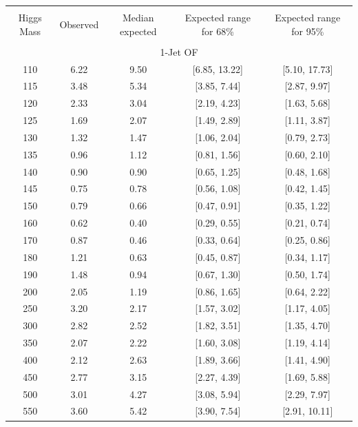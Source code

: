 \begin{table}[hbp!]
\begin{center}
\begin{tabular}{c c c c c}
\hline
\vspace{-3mm} && \\
 Higgs Mass & Observed  & Median expected & Expected range for 68\% & Expected range for 95\%   \\
\vspace{-3mm} && \\
\hline
\multicolumn{5}{c}{1-Jet OF} \\
\hline
110 & 6.22 & 9.50 & [6.85, 13.22] & [5.10, 17.73] \\
115 & 3.48 & 5.34 & [3.85, 7.44] & [2.87, 9.97] \\
120 & 2.33 & 3.04 & [2.19, 4.23] & [1.63, 5.68] \\
125 & 1.69 & 2.07 & [1.49, 2.89] & [1.11, 3.87] \\
130 & 1.32 & 1.47 & [1.06, 2.04] & [0.79, 2.73] \\
135 & 0.96 & 1.12 & [0.81, 1.56] & [0.60, 2.10] \\
140 & 0.90 & 0.90 & [0.65, 1.25] & [0.48, 1.68] \\
145 & 0.75 & 0.78 & [0.56, 1.08] & [0.42, 1.45] \\
150 & 0.79 & 0.66 & [0.47, 0.91] & [0.35, 1.22] \\
160 & 0.62 & 0.40 & [0.29, 0.55] & [0.21, 0.74] \\
170 & 0.87 & 0.46 & [0.33, 0.64] & [0.25, 0.86] \\
180 & 1.21 & 0.63 & [0.45, 0.87] & [0.34, 1.17] \\
190 & 1.48 & 0.94 & [0.67, 1.30] & [0.50, 1.74] \\
200 & 2.05 & 1.19 & [0.86, 1.65] & [0.64, 2.22] \\
250 & 3.20 & 2.17 & [1.57, 3.02] & [1.17, 4.05] \\
300 & 2.82 & 2.52 & [1.82, 3.51] & [1.35, 4.70] \\
350 & 2.07 & 2.22 & [1.60, 3.08] & [1.19, 4.14] \\
400 & 2.12 & 2.63 & [1.89, 3.66] & [1.41, 4.90] \\
450 & 2.77 & 3.15 & [2.27, 4.39] & [1.69, 5.88] \\
500 & 3.01 & 4.27 & [3.08, 5.94] & [2.29, 7.97] \\
550 & 3.60 & 5.42 & [3.90, 7.54] & [2.91, 10.11] \\

\end{tabular}
\end{center}
\end{table}
